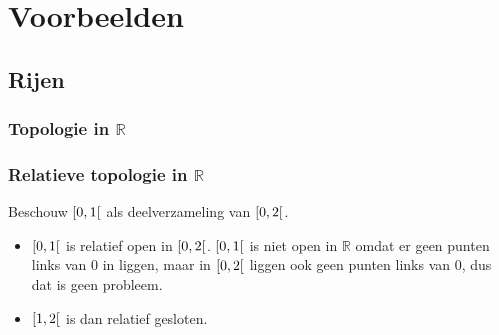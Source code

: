 \documentclass[main.tex]{subfiles}
\begin{document}
\chapter{Voorbeelden}
\label{cha:voorbeelden}

\section{Rijen}
\subsection{Topologie in $\mathbb{R}$}


\subsection{Relatieve topologie in $\mathbb{R}$}

\begin{vb}
  Beschouw $\interval[open right]{0}{1}$ als deelverzameling van $\interval[open right]{0}{2}$.
  \begin{itemize}
  \item $\interval[open right]{0}{1}$ is relatief open in $\interval[open right]{0}{2}$.
    $\interval[open right]{0}{1}$ is niet open in $\mathbb{R}$ omdat er geen punten links van $0$ in liggen, maar in $\interval[open right]{0}{2}$ liggen ook geen punten links van $0$, dus dat is geen probleem.
  \item $\interval[open right]{1}{2}$ is dan relatief gesloten.
  \end{itemize}
\end{vb}
\end{document}
